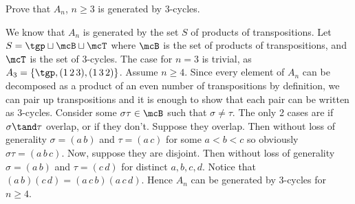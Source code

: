 \documentclass{article}
\begin{document}
\begin{exercise}
  Prove that \( A_n \), \( n\geq 3 \) is generated by 3-cycles. \label{eleven-four}
\end{exercise}
\begin{solution}
We know that \( A_n \) is generated by the set \( S \) of products of transpositions.
Let \( S=\tgp\sqcup \mcB\sqcup \mcT \) where \( \mcB \) is the set of products of transpositions, and \( \mcT \) is the set of 3-cycles.
The case for \( n=3 \) is trivial, as \( A_3 = \left\{ \tgp, (1\,2\,3), (1\,3\,2) \right\} \).
Assume \( n\geq 4 \).
Since every element of \( A_n \) can be decomposed as a product of an even number of transpositions by definition, we can pair up transpositions and it is enough to show that each pair can be written as 3-cycles.
Consider some \( \sigma\tau\in\mcB \) such that \( \sigma\neq\tau \).
The only 2 cases are if \( \sigma\tand \tau \) overlap, or if they don't.
Suppose they overlap.
Then without loss of generality \( \sigma = (a\,b) \) and \( \tau = (a\,c) \) for some \( a<b<c \) so obviously \( \sigma\tau = (a\,b\,c) \).
Now, suppose they are disjoint.
Then without loss of generality \( \sigma = (a\,b) \) and \( \tau = (c\,d) \) for distinct \( a,b,c,d \).
Notice that \( (a\,b)(c\,d) = (a\,c\,b)(a\,c\,d) \).
Hence \( A_n \) can be generated by 3-cycles for \( n\geq 4 \).
\end{solution}
\end{document}
